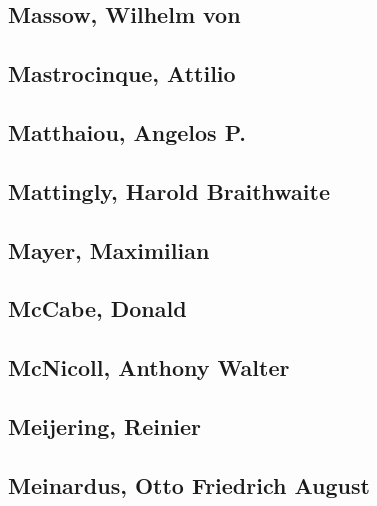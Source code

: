 \subsection[Massow, Wilhelm von (1)]{Massow, Wilhelm von}

\subsection[Mastrocinque, Attilio (2)]{Mastrocinque, Attilio}


\subsection[Matthaiou, Angelos P. (1)]{Matthaiou, Angelos P.}

\subsection[Mattingly, Harold Braithwaite (1)]{Mattingly, Harold Braithwaite}

\subsection[Mayer, Maximilian (1)]{Mayer, Maximilian}

\subsection[McCabe, Donald (1)]{McCabe, Donald}

\subsection[McNicoll, Anthony Walter (1)]{McNicoll, Anthony Walter}

\subsection[Meijering, Reinier (1)]{Meijering, Reinier}

\subsection[Meinardus, Otto Friedrich August (1)]{Meinardus, Otto Friedrich August}

